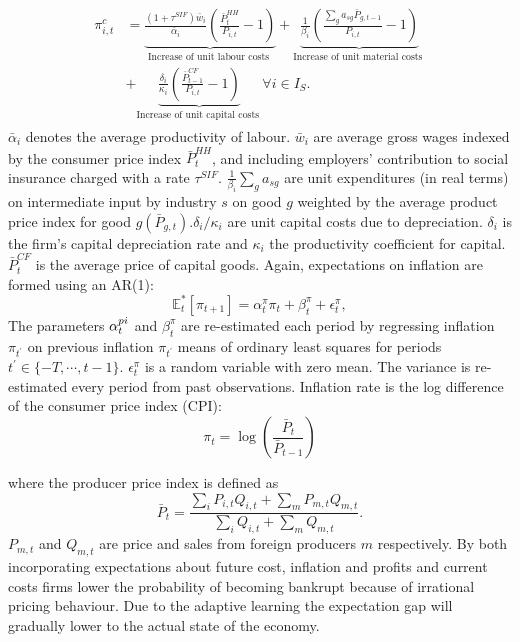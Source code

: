 \begin{align}
\begin{split}
\pi_{i,t}^c&=\underbrace{\frac{\left(1+\tau^{S I F}\right) \bar{w}_i}{\bar{\alpha}_i}\left(\frac{\bar{P}_t^{H H}}{P_{i,t}}-1\right)}_{\text {Increase of unit labour costs }}+\underbrace{\frac{1}{\beta_i}\left(\frac{\sum_g a_{s g} \bar{P}_{g,t-1}}{P_{i,t}}-1\right)}_{\text {Increase of unit material costs }}\\
&+\underbrace{\frac{\delta_i}{\kappa_i}\left(\frac{\bar{P}^{C F}_{t-1}}{P_{i,t}}-1\right)}_{\text {Increase of unit capital costs }} \forall i \in I_S .
\end{split}
\end{align}
 $\bar{\alpha}_i$ denotes the average productivity of labour. $\bar{w}_i$ are average gross wages indexed by the consumer price index $\bar{P}_t^{H H} $, and including employers' contribution to social insurance charged with a rate $\tau^{S I F}$. $ \frac{1}{\beta_i} \sum_g a_{s g}$ are unit expenditures (in real terms) on intermediate input by industry $s$ on good $g$ weighted by the average product price index for good $g\left(\bar{P}_{g,t}\right). \delta_i / \kappa_i$ are unit capital costs due to depreciation. $\delta_i$ is the firm's capital depreciation rate and $\kappa_i$ the productivity coefficient for capital. $\bar{P}^{C F}_t $ is the average price of capital goods. Again, expectations on inflation are formed using an AR(1):
\begin{equation}
\mathbb{E}^*_t[\pi_{t+1}] =\alpha^\pi_t \pi_t+\beta^\pi_{t}+\epsilon^\pi_{t}, 
\end{equation}
The parameters $\alpha_{t}^{\\pi}$ and $\beta_{t}^{\pi}$ are re-estimated each period by regressing inflation $\pi_{t^\prime}$ on previous inflation $\pi_{t^\prime}$ means of ordinary least squares for periods $t^\prime \in \{-T,\cdots,t-1\}$. $\epsilon_{t}^{\pi}$ is a random variable with zero mean. The variance is re-estimated every period from past observations. Inflation rate is the log difference of the consumer price index (CPI):
\begin{equation}
\pi_t=\log \left(\frac{\bar{P}_t}{\bar{P}_{t-1}}\right)
\label{eq:expected_inflation}
\end{equation}

where the producer price index is defined as
\begin{equation}
\bar{P}_t=\frac{\sum_i P_{i,t} Q_{i,t}+\sum_m P_{m,t} Q_{m,t}}{\sum_i Q_{i,t}+\sum_m Q_{m,t}}.
\end{equation}
$P_{m,t}$ and $ Q_{m,t}$ are price and sales from foreign producers $m$ respectively. By both incorporating expectations about future cost, inflation and profits and current costs firms lower the probability of becoming bankrupt because of irrational pricing behaviour. Due to the adaptive learning the expectation gap will gradually lower to the actual state of the economy.
